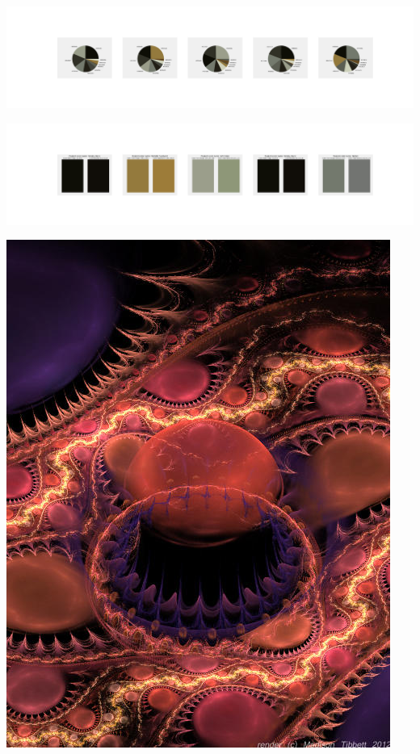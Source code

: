 \documentclass[11pt]{article}
\begin{document}
\begin{landscape}
    \begin{center}
    \includegraphics[width=250mm]{./nbimg/pie-417.jpg}
    \end{center}

    \begin{center}
    \includegraphics[width=250mm]{./nbimg/peak-417.jpg}
    \end{center}
    

    \begin{center}
    \includegraphics[width=\textwidth]{./nbimg/file (7).jpg}
    \end{center}


\end{landscape}
\end{document}
